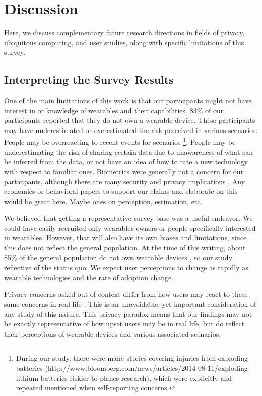 
\section{Discussion}
Here, we discuss complementary future research directions in fields of privacy, ubiquitous computing, and user studies, along with specific limitations of this survey.

\subsection{Interpreting the Survey Results}
One of the main limitations of this work is that our participants might not have interest in or knowledge of wearables and their capabilities. 83\% of our participants reported that they do not own a wearable device. These participants may have underestimated or overestimated the risk perceived in various scenarios. People may be overreacting to recent events for scenarios \footnote{During our study, there were many stories covering injuries from exploding batteries (http://www.bloomberg.com/news/articles/2014-08-11/exploding-lithium-batteries-riskier-to-planes-research), which were explicitly and repeated mentioned when self-reporting concerns.}. People may be underestimating the risk of sharing certain data due to unawareness of what can be inferred from the data, or not have an idea of how to rate a new technology with respect to familiar ones. Biometrics were generally not a concern for our participants, although there are many security and privacy implications \cite{prabhakar2003biometric}. {\color {red} Any economics or behavioral papers to support our claims and elaborate on this would be great here. Maybe ones on perception, estimation, etc.}

We believed that getting a representative survey base was a useful endeavor. We could have easily recruited only wearables owners or people specifically interested in wearables. However, that will also have its own biases and limitations, since this does not reflect the general population. At the time of this writing, about 85\% of the general population do not own wearable devices \cite{Nilsen,WearableStatNews}, so our study reflective of the status quo. We expect user perceptions to change as rapidly as wearable technologies and the rate of adoption change. 

Privacy concerns asked out of context differ from how users may react to these same concerns in real life \cite{norberg2007privacy, jensen2005privacy}. This is an unavoidable, yet important consideration of any study of this nature. This privacy paradox means that our findings may not be exactly representative of how upset users may be in real life, but do reflect their perceptions of wearable devices and various associated scenarios. 

